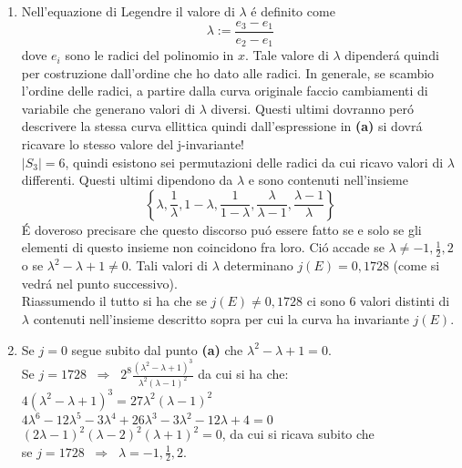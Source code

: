 \documentclass[a4paper]{article}
\newcommand{\ds}{\displaystyle}
\begin{document}
\begin{enumerate}
\begin{enumerate}
\item Nell'equazione di Legendre il valore di $\lambda$ \'e definito come 
$$\lambda:=\ds{\frac{e_3-e_1}{e_2-e_1}}$$
dove $e_i$ sono le radici del polinomio in $x$. Tale valore di $\lambda$ dipender\'a quindi per costruzione dall'ordine che ho dato alle radici. In generale, se scambio l'ordine delle radici, a partire dalla curva originale faccio cambiamenti di variabile che generano valori di $\lambda$ diversi. Questi ultimi dovranno per\'o descrivere la stessa curva ellittica quindi dall'espressione in \textbf{(a)} si dovr\'a ricavare lo stesso valore del j-invariante!\\
$|S_3|=6$, quindi esistono sei permutazioni delle radici da cui ricavo valori di $\lambda$ differenti. Questi ultimi dipendono da $\lambda$ e sono contenuti nell'insieme
$$\ds{\left\{\lambda,\frac{1}{\lambda},1-\lambda,\frac{1}{1-\lambda},
\frac{\lambda}{\lambda-1},\frac{\lambda-1}{\lambda}\right\}}$$
\'E doveroso precisare che questo discorso pu\'o essere fatto se e solo se gli elementi di questo insieme non coincidono fra loro. Ci\'o accade se $\lambda\neq -1,\frac{1}{2},2$ o se $\lambda^2-\lambda+1\neq 0 $.
Tali valori di $\lambda$ determinano $j(E)=0,1728$ (come si vedr\'a nel punto successivo).\\
Riassumendo il tutto si ha che se $j(E) \neq 0,1728$ ci sono $6$ valori distinti di $\lambda$ contenuti nell'insieme descritto sopra per cui la curva ha invariante $j(E)$.

\item Se $j=0$ segue subito dal punto \textbf{(a)} che $\lambda^2-\lambda+1=0$.\\
Se $j=1728\;\;\Rightarrow\;\;\ds{2^8\frac{(\lambda^2-\lambda+1)^3}{\lambda^2(\lambda-1)^2}}$ da cui si ha che:\\
$4(\lambda^2-\lambda+1)^3=27\lambda^2(\lambda-1)^2$\\
$4\lambda^6-12\lambda^5-3\lambda^4+26\lambda^3-3\lambda^2-12\lambda+4=0$\\
$(2\lambda-1)^2(\lambda-2)^2(\lambda+1)^2=0$, da cui si ricava subito che \\
se $j=1728\;\;\Rightarrow\;\;\lambda=-1,\frac{1}{2},2$.
\end{enumerate}






\end{enumerate}
\end{document}
